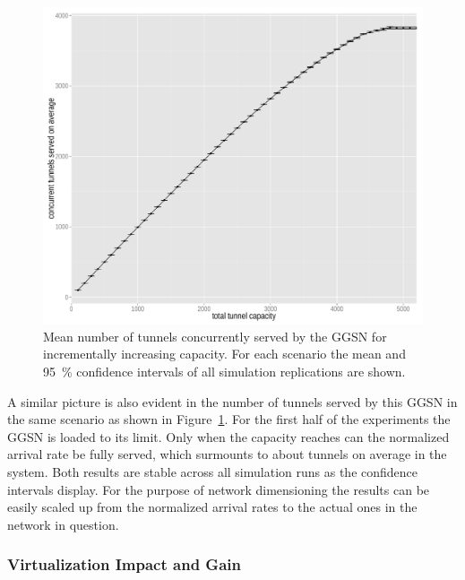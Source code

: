 \begin{figure}[htb]
  \centering
  \includegraphics[width=1.0\textwidth]{images/R-monolithic-tunnelusage.pdf}
  \caption{Mean number of tunnels concurrently served by the \gls{GGSN} for incrementally increasing capacity. For each scenario the mean and \SI{95}{\percent} confidence intervals of all simulation replications are shown.}
\label{c4:fig:traditional_tunnelusage}
\end{figure}


A similar picture is also evident in the number of tunnels served by this \gls{GGSN} in the same scenario as shown in Figure~\ref{c4:fig:traditional_tunnelusage}. For the first half of the experiments the \gls{GGSN} is loaded to its limit. Only when the capacity reaches  can the normalized arrival rate be fully served, which surmounts to about  tunnels on average in the system. Both results are stable across all simulation runs as the confidence intervals display. For the purpose of network dimensioning the results can be easily scaled up from the normalized arrival rates to the actual ones in the network in question.


\subsubsection{Virtualization Impact and Gain}

